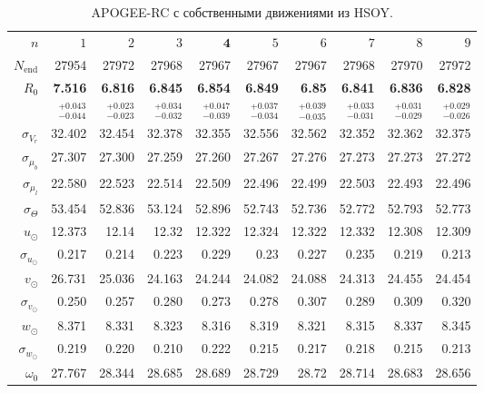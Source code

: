 \documentclass{matmex-diploma-custom}
\begin{document}
\begin{table}[h!]
\centering
\caption{APOGEE-RC с собственными движениями из HSOY.}
\begin{tabular}{r|rrrr|r|rrrr}
\hline
$n$ & $1$ & $2$ & $3$ & $\textbf{4}$ & $5$&$ 6 $&$ 7 $&$ 8 $&$ 9 $\\
 $N_{\mathrm{end}}$ & 27954       &    27972 &    27968 &    27967 &   27967 &    27967 &    27968 &    27970 &    27972 \\
 $R_0 $&  \textbf{7.516}       &    \textbf{6.816} &    \textbf{6.845} &    \textbf{6.854} &   \textbf{6.849} &     \textbf{6.85} &    \textbf{6.841} &    \textbf{6.836} &    \textbf{6.828} \\
       & $_{-0.044}^{+0.043} $ & $_{-0.023}^{+0.023}$ & $_{-0.032}^{+0.034}$   & $_{-0.039}^{+0.047}$  & $_{-0.034}^{+0.037}$  & $_{-0.035}^{+0.039}$  & $_{-0.031}^{+0.033}$  & $_{-0.029}^{+0.031}$  & $_{-0.026}^{+0.029}$  \\\hline
 $\sigma_{V_r} $& 32.402      &  32.454 &  32.378 &  32.355 &  32.556 &  32.562 &  32.352 &  32.362 &  32.375  \\ 
 $\sigma_{\mu_b} $& 27.307      &  27.300 &  27.259 &  27.260 &  27.267 &  27.276 &  27.273 &  27.273 &  27.272  \\ 
 $\sigma_{\mu_l} $& 22.580      &  22.523 &  22.514 &  22.509 &  22.496 &  22.499 &  22.503 &  22.493 &  22.496  \\\hline 
 $\sigma_{\Theta} $& 53.454      &  52.836 &  53.124 &  52.896 &  52.743 &  52.736 &  52.772 &  52.793 &  52.773  \\\hline 
 $ u_{\odot} $& 12.373      &    12.14 &    12.32 &   12.322 &  12.324 &   12.322 &   12.332 &   12.308 &   12.309 \\
 $\sigma_{u_{\odot}} $&0.217       &    0.214 &    0.223 &    0.229 &    0.23 &    0.227 &    0.235 &    0.219 &    0.213 \\
 $v_{\odot} $& 26.731      &   25.036 &   24.163 &   24.244 &  24.082 &   24.088 &   24.313 &   24.455 &   24.454 \\
 $\sigma_{v_{\odot}}$&0.250       &    0.257 &     0.280 &    0.273 &   0.278 &    0.307 &    0.289 &    0.309 &     0.320 \\
 $w_{\odot} $& 8.371       &    8.331 &    8.323 &    8.316 &   8.319 &    8.321 &    8.315 &    8.337 &    8.345 \\
 $\sigma_{w_{\odot}}$&0.219       &     0.220 &     0.210 &    0.222 &   0.215 &    0.217 &    0.218 &    0.215 &    0.213 \\
 $\omega_0 $&27.767      &   28.344 &   28.685 &   28.689 &  28.729 &    28.72 &   28.714 &   28.683 &   28.656 \\

\end{tabular}
\end{table}
\end{document}
